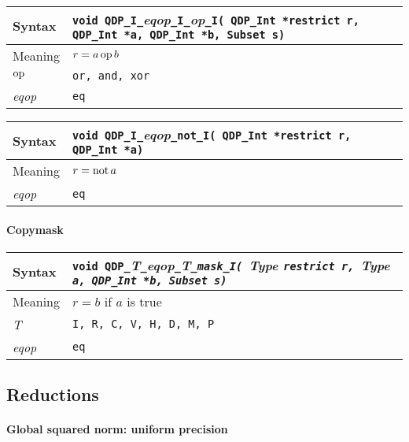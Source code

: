 \documentclass{article}
\newcommand{\op}{\mathop{\rm op}}
\renewcommand{\not}{\mathop{\rm not}}
\newcommand{\tInt}{QDP\ttdash Int }
\newcommand{\namespace}{QDP}
\newcommand{\allNumericTypes}{{\tt I, R, C, V, H, D, M, P}}
\newcommand{\ttdash}{{\tt \_}}
\newcommand{\itt}{\it T}
\newcommand{\extraarg}{, Subset s}
\begin{document}
\begin{flushleft}
  \begin{tabular}{|l|l|}
  \hline
  Syntax      & {\tt void \namespace}\ttdash{\tt I}\ttdash{\it eqop}\ttdash{\tt I}\ttdash{\it op}\ttdash{\tt I( \tInt *restrict r, \tInt *a, \tInt *b\extraarg)} \\
  \hline
  Meaning     & $r = a \op b$\\
  \hline
  $\op$       & {\tt or, and, xor} \\
  \hline
  {\it eqop}  & {\tt eq} \\
  \hline
  \end{tabular}
\end{flushleft}

\begin{flushleft}
  \begin{tabular}{|l|l|}
  \hline
  Syntax      & {\tt void \namespace}\ttdash{\tt I}\ttdash{\it eqop}\ttdash{\tt not}\ttdash{\tt I( \tInt *restrict r, \tInt *a)} \\
  \hline
  Meaning     & $r = \not a$\\
  \hline
  {\it eqop}  & {\tt eq} \\
  \hline
  \end{tabular}
\end{flushleft}

\paragraph{Copymask}

\begin{flushleft}
  \begin{tabular}{|l|l|}
  \hline
  Syntax      & {\tt void \namespace}\ttdash\itt\ttdash{\it eqop}\ttdash\itt\ttdash{\tt mask}\ttdash{\tt I}{\tt ( }{\it Type }{\tt *restrict r, }{\it Type }{\tt *a, }{\tt \tInt *b\extraarg)} \\
  \hline
  Meaning     & $r = b$ if $a$ is true\\
  \hline
  \itt        & \allNumericTypes \\
  \hline
  {\it eqop}  & {\tt eq} \\
  \hline
  \end{tabular}
\end{flushleft}

\subsection{Reductions}

\paragraph{Global squared norm: uniform precision}
\end{document}
